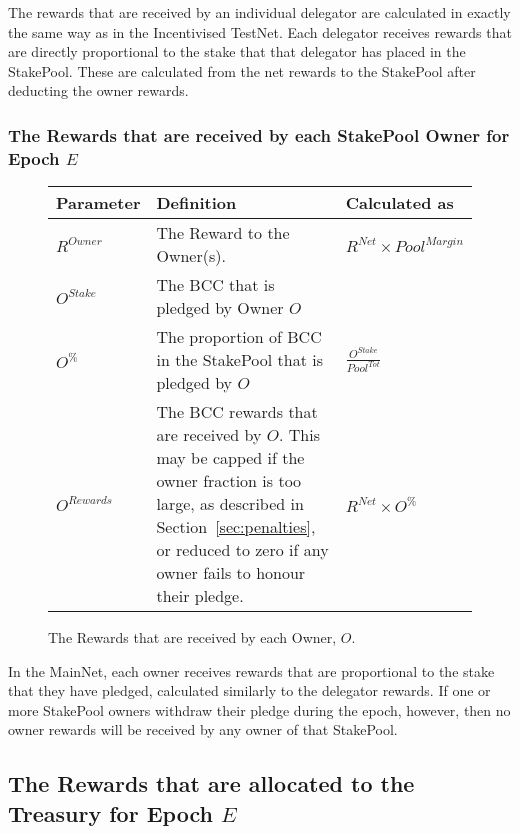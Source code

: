 \documentclass[11pt,a4paper,dvipsnames,twosided,final]{article}
\newcommand{\bcc}{BCC{}}
\newcommand{\bcc}[1]{Bcc}
\begin{document}
\noindent
The rewards that are received by an individual delegator are calculated in exactly the same way as in
the Incentivised TestNet.  Each delegator receives rewards that are directly proportional to the
stake that that delegator has placed in the StakePool.  These are calculated from the net rewards to the
StakePool after deducting the owner rewards.

\subsubsection*{The Rewards that are received by each StakePool Owner for Epoch $E$}

\begin{figure}[h!]
\begin{center}
\begin{tabular}{||l|p{9cm}|l||}
  \hline \hline
\textbf{Parameter}  & \textbf{Definition} & \textbf{Calculated as} \\\hline
$R^\textit{Owner}$ & The Reward to the Owner(s).  & $R^{\textit{Net}} \times {\textit{Pool}}^{\textit{Margin}}$ \\\hline
$O^\textit{Stake}$ & The \bcc{} that is pledged by Owner $O$ & \\\hline
$O^\%$ & The proportion of \bcc{} in the StakePool that is pledged by $O$ & $\frac{O^{Stake}}{Pool^{Tot}}$ \\\hline
$O^{Rewards}$ & The \bcc{} rewards that are received by $O$. This may be capped if the owner fraction is too large,
as described in Section~\ref{sec:penalties}, or reduced to zero if any owner fails to honour their pledge. & $R^{\textit{Net}} \times O^\%$ \\\hline
\hline
\end{tabular}
\end{center}
\caption{The Rewards that are received by each Owner, $O$.}
\end{figure}

\noindent
In the MainNet, each owner receives rewards that are proportional to the stake that they have pledged,
calculated similarly to the delegator rewards.  If one or more StakePool owners withdraw their pledge during the epoch,
however, then no owner rewards will be received by any owner of that StakePool.


\clearpage
\subsection{The Rewards that are allocated to the Treasury for Epoch $E$}
\end{document}
